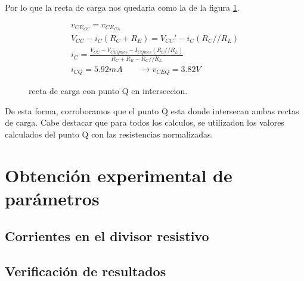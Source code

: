     Por lo que la recta de carga nos quedaria como la de la figura \ref{fig:recta_carga}.
    \begin{figure}[!ht]
      \centering
      \begin{minipage}{0.45\textwidth}
      \end{minipage}
      \begin{minipage}{0.54\textwidth}
        \begin{gather*}
          v_{CE_{CC}} = v_{CE_{CA}}\\[6pt]
          V_{CC} - i_C (R_C + R_E) = V_{CC}' - i_C (R_C//R_L)\\[6pt]
          i_C = \frac{V_{CC} - V_{CEQ mes} - I_{CQ mes} (R_C//R_L)}{R_C + R_E - R_C//R_L}\\[6pt]
          i_{CQ} = 5.92mA \qquad \to v_{CEQ} = 3.82V
        \end{gather*}
      \end{minipage}
      \caption{recta de carga con punto Q en interseccion.}
      \label{fig:recta_carga}
    \end{figure}

    De esta forma, corroboramos que el punto Q esta donde intersecan ambas rectas de carga. Cabe destacar que para todos
    los calculos, se utilizadon los valores calculados del punto Q con las resistencias normalizadas.
  \section{Obtención experimental de parámetros}
    \subsection{Corrientes en el divisor resistivo}
    \subsection{Verificación de resultados}

